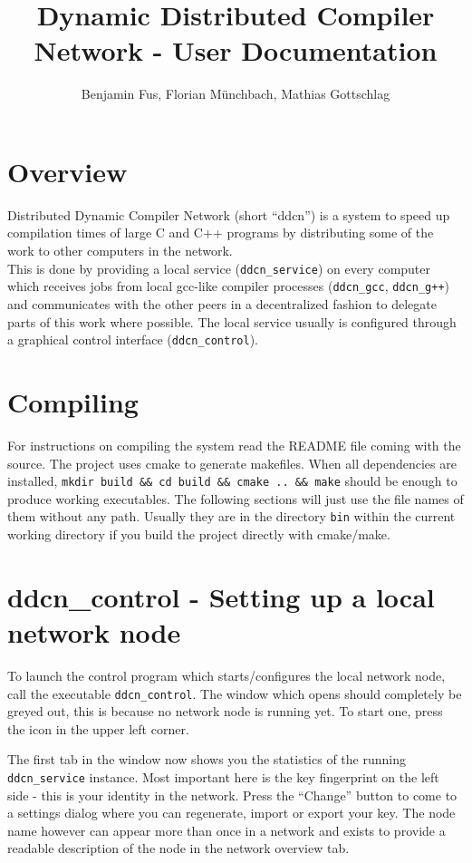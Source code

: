 \documentclass[a4paper,9pt]{scrartcl}
\title{Dynamic Distributed Compiler Network - User Documentation}
\author{Benjamin Fus, Florian Münchbach, Mathias Gottschlag}
\begin{document}
\maketitle

\section{Overview}

Distributed Dynamic Compiler Network (short ``ddcn'') is a system to speed up compilation times of large C and C++ programs by distributing some of the work to other computers in the network.\\This is done by providing a local service (\texttt{ddcn\_service}) on every computer which receives jobs from local  gcc-like compiler processes (\texttt{ddcn\_gcc}, \texttt{ddcn\_g++}) and communicates with the other peers in a decentralized fashion to delegate parts of this work where possible. The local service usually is configured through a graphical control interface (\texttt{ddcn\_control}).

\section{Compiling}

For instructions on compiling the system read the README file coming with the source. The project uses cmake to generate makefiles. When all dependencies are installed, \texttt{mkdir build \&\& cd build \&\& cmake .. \&\& make} should be enough to produce working executables. The following sections will just use the file names of them without any path. Usually they are in the directory \texttt{bin} within the current working directory if you build the project directly with cmake/make.

\section{ddcn\_control - Setting up a local network node}

To launch the control program which starts/configures the local network node, call the executable \texttt{ddcn\_control}. The window which opens should completely be greyed out, this is because no network node is running yet. To start one, press the icon in the upper left corner.

The first tab in the window now shows you the statistics of the running \texttt{ddcn\_service} instance. Most important here is the key fingerprint on the left side - this is your identity in the network. Press the ``Change'' button to come to a settings dialog where you can regenerate, import or export your key. The node name however can appear more than once in a network and exists to provide a readable description of the node in the network overview tab.
\end{document}
